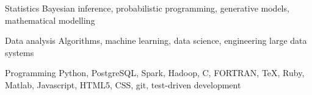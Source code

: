 
\begin{cvskills}

	\cvskill
	{Statistics}
    {Bayesian inference, probabilistic programming, generative models, mathematical modelling}

  	\cvskill
	{Data analysis}
    {Algorithms, machine learning, data science, engineering large data systems}

  	\cvskill
    {Programming}
    {Python, PostgreSQL, Spark, Hadoop, C, FORTRAN, \TeX, Ruby, Matlab, Javascript, HTML5, CSS, git, test-driven development}
        
\end{cvskills}
